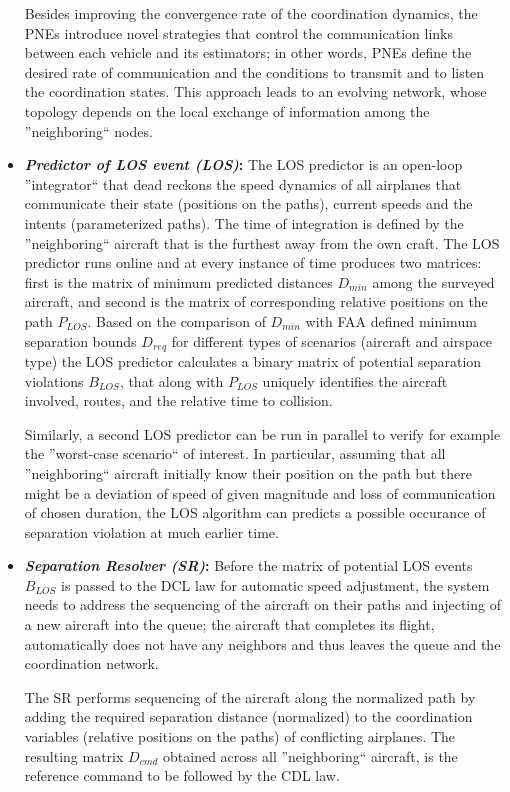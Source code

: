\documentclass[letter,onecolumn,12pt]{aiaa-tc}
\newcommand{\1}{1_n}
\begin{document}
\begin{itemize}
Besides improving  the convergence rate of the coordination dynamics, the PNEs introduce novel strategies that control the communication links between each vehicle and its estimators; in other words, PNEs define the desired rate of communication and the conditions to transmit and to listen the coordination states. This approach leads to an evolving network, whose topology depends on the local exchange of information among the ''neighboring`` nodes.

\item \textbf{\emph{Predictor of LOS event (LOS)}:} The LOS predictor is an open-loop ''integrator`` that dead reckons the speed dynamics of all airplanes that communicate their state (positions on the paths), current speeds and the intents (parameterized paths). The time of integration is defined by the ''neighboring`` aircraft that is the furthest away from the own craft. The LOS predictor runs online and at every instance of time produces two matrices: first is the matrix of minimum predicted distances $D_{min}$ among the surveyed aircraft, and second is the matrix of corresponding relative positions on the path $P_{LOS}$. Based on the comparison of $D_{min}$ with FAA defined minimum separation bounds $D_{req}$ for different types of scenarios (aircraft and airspace type) the LOS predictor calculates a binary matrix of potential separation violations $B_{LOS}$, that along with $P_{LOS}$ uniquely identifies the aircraft involved, routes, and the relative time to collision.

Similarly, a second LOS predictor can be run in parallel to verify for example the ''worst-case scenario`` of interest. In particular, assuming that all ''neighboring`` aircraft initially know their  position on the path but there might be a deviation of speed of given magnitude and loss of communication of chosen duration, the LOS algorithm can predicts a possible occurance of separation violation at much earlier time.

\item \textbf{\emph{Separation Resolver (SR)}:} Before the matrix of potential LOS events $B_{LOS}$ is passed to the DCL law for automatic speed adjustment, the system needs to address the sequencing of the aircraft on their paths and injecting of a new aircraft into the queue; the aircraft that completes its flight, automatically does not have any neighbors and thus leaves the queue and the coordination network.

The SR performs sequencing of the aircraft along the normalized path by adding the required separation distance (normalized) to the coordination variables (relative positions on the paths) of conflicting airplanes. The resulting matrix $D_{cmd}$ obtained across all ''neighboring`` aircraft, is the reference command to be followed by the CDL law.


\end{itemize}
\end{document}
